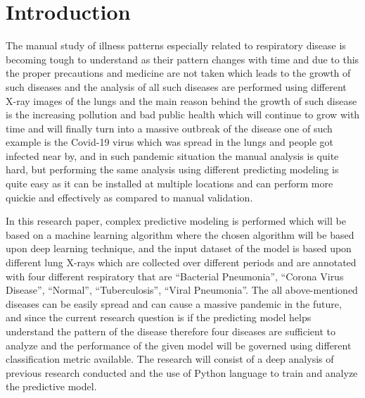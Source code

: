 \chapter{Introduction}
\label{ch:into} %

The manual study of illness patterns especially related to respiratory disease\cite{Zimlich} is becoming tough to understand as their pattern changes with time and due to this the proper precautions and medicine are not taken which leads to the growth of such diseases and the analysis of all such diseases are performed using different X-ray images of the lungs and the main reason behind the growth of such disease is the increasing pollution and bad public health which will continue to grow with time and will finally turn into a massive outbreak of the disease one of such example is the Covid-19\cite{WHO} virus  which was spread in the lungs and people got infected near by, and in such pandemic situation the manual analysis is quite hard, but performing the same analysis using different predicting modeling is quite easy as it can be installed at multiple locations and can perform more quickie and effectively as compared to manual validation. 

In this research paper, complex predictive modeling is performed which will be based on a machine learning algorithm where the chosen algorithm will be based upon deep learning technique, and the input dataset \cite{Kaggle} of the model is based upon different lung X-rays which are collected over different periods and are annotated with four different respiratory that are “Bacterial Pneumonia”, “Corona Virus Disease”, “Normal”, “Tuberculosis”, “Viral Pneumonia”. The all above-mentioned diseases can be easily spread and can cause a massive pandemic in the future, and since the current research question is if the predicting model helps understand the pattern of the disease therefore four diseases are sufficient to analyze and the performance of the given model will be governed using different classification metric \cite{JP} available. The research will consist of a deep analysis of previous research conducted and the use of Python language to train and analyze the predictive model.


